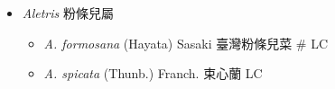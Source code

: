 
  \begin{itemize}
 \item[] \textit{Aletris} 粉條兒屬
                                
  \begin{itemize}
        \item[] \textit{A. formosana} (Hayata) Sasaki  臺灣粉條兒菜  \# LC
        \item[] \textit{A. spicata} (Thunb.) Franch.  束心蘭   LC
  \end{itemize}
  \end{itemize}

